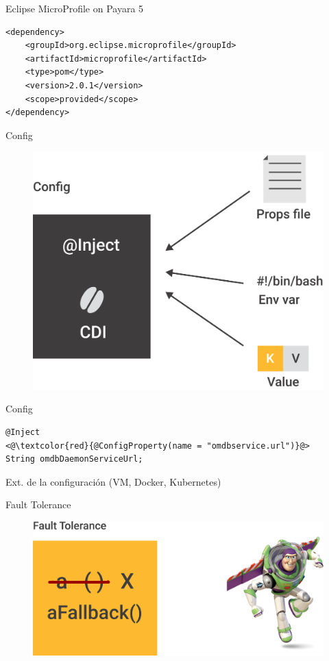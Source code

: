 \documentclass{beamer}
\begin{document}
\begin{frame}[fragile]{Eclipse MicroProfile on Payara 5}
\begin{lstlisting}
<dependency>
	<groupId>org.eclipse.microprofile</groupId>
	<artifactId>microprofile</artifactId>
	<type>pom</type>
	<version>2.0.1</version>
	<scope>provided</scope>
</dependency>
\end{lstlisting}
\end{frame}

\begin{frame}{Config}
\begin{figure}
	\centering
	\includegraphics[width=0.75\linewidth]{Images/config}
\end{figure}
\end{frame}




\begin{frame}[fragile]{Config}
\begin{lstlisting}
@Inject
<@\textcolor{red}{@ConfigProperty(name = "omdbservice.url")}@>
String omdbDaemonServiceUrl;
\end{lstlisting}

Ext. de la configuración (VM, Docker, Kubernetes)
\end{frame}


\begin{frame}{Fault Tolerance}
\begin{figure}
	\centering
	\includegraphics[width=0.75\linewidth]{Images/faulttolerance}
\end{figure}
\end{frame}
\end{document}
